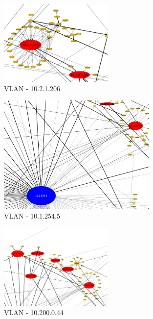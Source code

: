 \begin{figure}[!htb]
    \centering
    \includegraphics[width=0.5\textwidth]{img/graph/escenario_1/vlan1/vlan1_1000toEnd_10_2_1_206}
    \caption{VLAN  - 10.2.1.206}
    \label{fig:vlan1_grafo_10_2_1_206}
\end{figure}

\begin{figure}
    \centering
    \includegraphics[width=0.7\textwidth]{img/graph/escenario_1/vlan1/vlan1_1000toEnd_10_1_254_5}
    \caption{VLAN  - 10.1.254.5}
    \label{fig:vlan1_grafo_10_1_254_5}
\end{figure}

\begin{figure}[!ht]
    \centering
    \includegraphics[width=0.5\textwidth]{img/graph/escenario_1/vlan1/vlan1_1000toEnd_10_200_0_44}
    \caption{VLAN  - 10.200.0.44}
    \label{fig:vlan1_grafo_10_200_0_44}
\end{figure}

